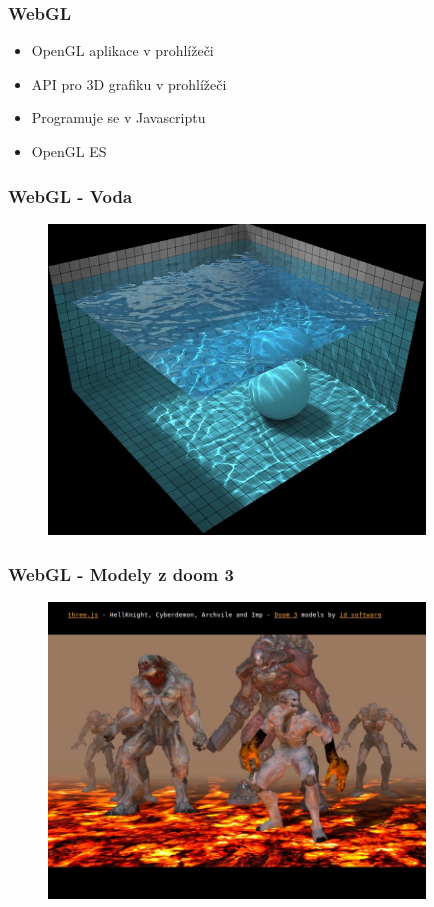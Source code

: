 
\begin{frame}
\frametitle{WebGL}
	\begin{itemize}
	\item{OpenGL aplikace v prohlížeči}
	\item{API pro 3D grafiku v prohlížeči}
	\item{Programuje se v Javascriptu}
	\item{OpenGL ES}
	\end{itemize}
\end{frame}

\begin{frame}
\frametitle{WebGL - Voda}
	\begin{figure}[h]
	\includegraphics[width=10cm,keepaspectratio]{pics/webgl_water.jpg}
	\end{figure}
\end{frame}

\begin{frame}
\frametitle{WebGL - Modely z doom 3}
	\begin{figure}[h]
	\includegraphics[width=10cm,keepaspectratio]{pics/webgl_doom.jpg}
	\end{figure}
\end{frame}



